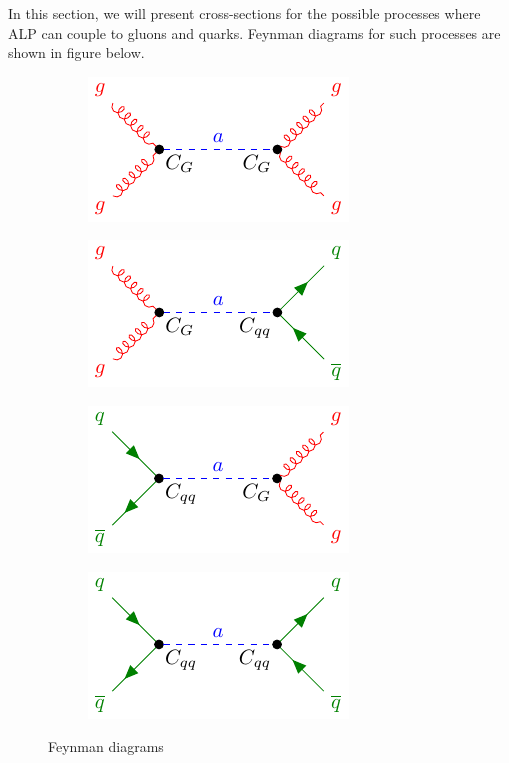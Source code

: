 \documentclass[12pt,a4paper]{article}
\begin{document}
In this section, we will present cross-sections for the possible processes where ALP can couple to gluons and quarks. Feynman diagrams for such processes are shown in figure below.

\begin{figure}[h!]
	\begin{subfigure}{6.5cm}
	\centering\includegraphics[scale=0.7]{gg_to_gg.pdf}
	\end{subfigure}
	\begin{subfigure}{6.5cm}
	\centering\includegraphics[scale=0.7]{gg_to_qq.pdf}
	\end{subfigure}
	
	\begin{subfigure}{6.5cm}
	\centering\includegraphics[scale=0.7]{qq_to_gg.pdf}
	\end{subfigure}
	\begin{subfigure}{6.5cm}
	\centering\includegraphics[scale=0.7]{qq_to_qq.pdf}
	\end{subfigure}
\caption{Feynman diagrams}
\label{fig: figure2}
\end{figure}
\end{document}
